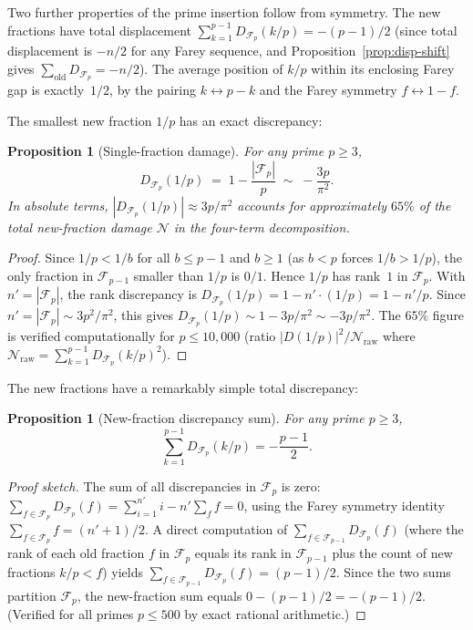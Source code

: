 \documentclass[11pt]{article}
\newtheorem{proposition}[theorem]{Proposition}
\theoremstyle{definition}
\newcommand{\F}{\mathcal{F}}
\begin{document}
Two further properties of the prime insertion follow from symmetry.
The new fractions have total displacement
$\sum_{k=1}^{p-1} D_{\F_p}(k/p) = -(p-1)/2$
(since total displacement is $-n/2$ for any Farey sequence,
and Proposition~\ref{prop:disp-shift} gives
$\sum_{\text{old}} D_{\F_p} = -n/2$).
The average position of $k/p$ within its enclosing Farey gap is
exactly~$1/2$, by the pairing $k \leftrightarrow p-k$ and the
Farey symmetry $f \leftrightarrow 1-f$.

The smallest new fraction $1/p$ has an exact discrepancy:

\begin{proposition}[Single-fraction damage]\label{prop:single-frac-damage}
For any prime $p \ge 3$,
\[
  D_{\F_p}(1/p) \;=\; 1 - \frac{|\F_p|}{p} \;\sim\; -\frac{3p}{\pi^2}.
\]
In absolute terms, $|D_{\F_p}(1/p)| \approx 3p/\pi^2$ accounts for
approximately $65\%$ of the total new-fraction damage $\mathcal{N}$
in the four-term decomposition.
\end{proposition}

\begin{proof}
Since $1/p < 1/b$ for all $b \le p-1$ and $b \ge 1$ (as $b < p$
forces $1/b > 1/p$), the only fraction in $\F_{p-1}$ smaller than
$1/p$ is $0/1$.  Hence $1/p$ has rank~$1$ in $\F_p$.
With $n' = |\F_p|$, the rank discrepancy is
$D_{\F_p}(1/p) = 1 - n' \cdot (1/p) = 1 - n'/p$.
Since $n' = |\F_p| \sim 3p^2/\pi^2$, this gives
$D_{\F_p}(1/p) \sim 1 - 3p/\pi^2 \sim -3p/\pi^2$.
The $65\%$ figure is verified computationally for $p \le 10{,}000$
(ratio $|D(1/p)|^2 / \mathcal{N}_{\text{raw}}$ where
$\mathcal{N}_{\text{raw}} = \sum_{k=1}^{p-1} D_{\F_p}(k/p)^2$).
\end{proof}

The new fractions have a remarkably simple total discrepancy:

\begin{proposition}[New-fraction discrepancy sum]\label{prop:new-disp-sum}
For any prime $p \ge 3$,
\[
  \sum_{k=1}^{p-1} D_{\F_p}(k/p) = -\frac{p-1}{2}.
\]
\end{proposition}

\begin{proof}[Proof sketch]
The sum of all discrepancies in $\F_p$ is zero:
$\sum_{f \in \F_p} D_{\F_p}(f) = \sum_{i=1}^{n'} i - n' \sum_{f} f = 0$,
using the Farey symmetry identity $\sum_{f \in \F_p} f = (n'+1)/2$.
A direct computation of $\sum_{f \in \F_{p-1}} D_{\F_p}(f)$
(where the rank of each old fraction $f$ in $\F_p$ equals its rank
in $\F_{p-1}$ plus the count of new fractions $k/p < f$) yields
$\sum_{f \in \F_{p-1}} D_{\F_p}(f) = (p-1)/2$.
Since the two sums partition $\F_p$, the new-fraction sum equals
$0 - (p-1)/2 = -(p-1)/2$.
(Verified for all primes $p \le 500$ by exact rational arithmetic.)
\end{proof}
\end{document}

